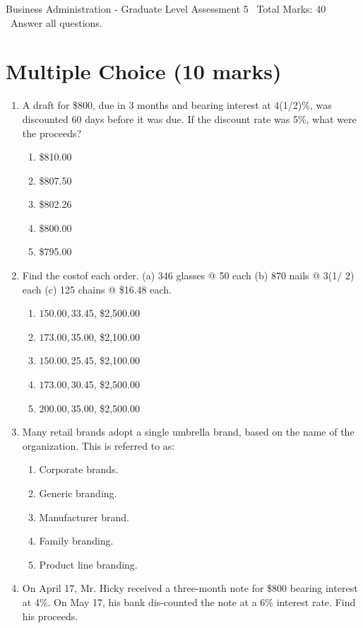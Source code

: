 \documentclass[12pt]{article}
\begin{document}
\begin{center}
Business Administration - Graduate Level Assessment 5 \
Total Marks: 40 \
Answer all questions.
\end{center}

\section*{Multiple Choice (10 marks)}
\begin{enumerate}[label=\arabic*.]
\item A draft for \$800, due in 3 months and bearing interest at 4(1/2)\%, was discounted 60 days before it was due. If the discount rate was 5\%, what were the proceeds?
\begin{enumerate}[label=(\alph*)]
    \item \$810.00
    \item \$807.50
    \item \$802.26
    \item \$800.00
    \item \$795.00
\end{enumerate}
\item Find the costof each order. (a) 346 glasses @ 50 \textcent each (b) 870 nails @ 3(1/ 2) \textcent each (c) 125 chains @ \$16.48 each.
\begin{enumerate}[label=(\alph*)]
    \item $150.00, $33.45, \$2,500.00
    \item $173.00, $35.00, \$2,100.00
    \item $150.00, $25.45, \$2,100.00
    \item $173.00, $30.45, \$2,500.00
    \item $200.00, $35.00, \$2,500.00
\end{enumerate}
\item Many retail brands adopt a single umbrella brand, based on the name of the organization. This is referred to as:
\begin{enumerate}[label=(\alph*)]
    \item Corporate brands.
    \item Generic branding.
    \item Manufacturer brand.
    \item Family branding.
    \item Product line branding.
\end{enumerate}
\item On April 17, Mr. Hicky received a three-month note for \$800 bearing interest at 4\%. On May 17, his bank dis-counted the note at a 6\% interest rate. Find his proceeds.

\end{enumerate}
\end{document}
